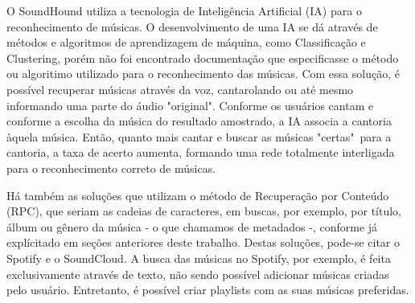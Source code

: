 
O SoundHound utiliza a tecnologia de Inteligência Artificial (IA)  para o reconhecimento de músicas. O desenvolvimento de uma IA se dá através de métodos e algoritmos de aprendizagem de máquina, como Classificação e Clustering, porém não foi encontrado documentação que especificasse o método ou algoritimo utilizado para o reconhecimento das músicas. Com essa solução, é possível recuperar músicas através da voz, cantarolando ou até mesmo informando uma parte do áudio "original". Conforme os usuários cantam e conforme a escolha da música do resultado amostrado, a IA associa a cantoria àquela música. Então, quanto mais cantar e buscar as músicas "certas"\ para a cantoria, a taxa de acerto aumenta, formando uma rede totalmente interligada para o reconhecimento correto de músicas.

Há também as soluções que utilizam o método de Recuperação por Conteúdo (RPC), que seriam as cadeias de caracteres, em buscas, por exemplo, por título, álbum ou gênero da música - o que chamamos de metadados -, conforme já explícitado em seções anteriores deste trabalho. Destas soluções, pode-se citar o Spotify e o SoundCloud. A busca das músicas no Spotify, por exemplo, é feita exclusivamente através de texto, não sendo possível adicionar músicas criadas pelo usuário. Entretanto, é possível criar playlists com as suas músicas preferidas.


